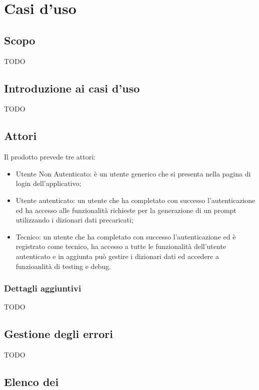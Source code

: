 \section{Casi d'uso}

\subsection{Scopo}
TODO
\subsection{Introduzione ai casi d'uso}
TODO

\subsection{Attori}
Il prodotto prevede tre attori:
\begin{itemize}
  \item Utente Non Autenticato: è un utente generico che si presenta nella pagina di login dell'applicativo;
  \item Utente autenticato: un utente che ha completato con successo l'autenticazione ed ha accesso alle funzionalità richieste per la generazione di un prompt utilizzando i dizionari dati precaricati;
  \item Tecnico: un utente che ha completato con successo l'autenticazione ed è registrato come tecnico, ha accesso a tutte le funzionalità dell'utente autenticato e in aggiunta può gestire i dizionari dati ed accedere a funzioanlità di testing e debug.
\end{itemize}

\subsubsection{Dettagli aggiuntivi}
TODO

\subsection{Gestione degli errori}
TODO

\subsection{Elenco dei }



















